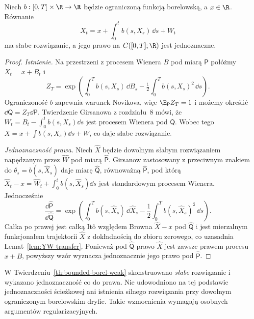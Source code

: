 \begin{twierdzenie}
\label{th:bounded-borel-weak}
Niech $b:[0,T]\times\R\to\R$ będzie ograniczoną funkcją
borelowską, a $x\in\R$. Równanie
\[
 X_t=x+\int_0^t b(s,X_s)\,\dd s+W_t
 \tag{14.2}\label{eq:borel-drift}
\]
ma słabe rozwiązanie, a jego prawo na $C([0,T];\R)$
jest jednoznaczne.
\end{twierdzenie}
\begin{proof}
\emph{Istnienie.} Na przestrzeni z procesem Wienera $B$
pod miarą $\mathsf P$ połóżmy $X_t=x+B_t$ i
\[
 Z_T=\exp\left(\int_0^Tb(s,X_s)\,\dd B_s
 -\tfrac12\int_0^Tb(s,X_s)^2\,\dd s\right).
\]
Ograniczoność $b$ zapewnia warunek Novikova,
więc $\E_{\mathsf P}Z_T=1$ i możemy określić
$\dd\mathsf Q=Z_T\dd\mathsf P$.
Twierdzenie Girsanowa z rozdziału~8 mówi, że
$W_t=B_t-\int_0^tb(s,X_s)\dd s$ jest
procesem Wienera pod $\mathsf Q$.
Wobec tego $X=x+\int b(s,X_s)\dd s+W$,
co daje słabe rozwiązanie.

\emph{Jednoznaczność prawa.} Niech $\widehat X$ będzie
dowolnym słabym rozwiązaniem napędzanym przez
$\widehat W$ pod miarą $\widehat{\mathsf P}$.
Girsanow zastosowany z przeciwnym znakiem do
$\theta_s=b(s,\widehat X_s)$ daje miarę
$\widehat{\mathsf Q}$, równoważną
$\widehat{\mathsf P}$, pod którą
$\widehat X_t-x=\widehat W_t+
\int_0^tb(s,\widehat X_s)\dd s$ jest
standardowym procesem Wienera. Jednocześnie
\[
 \frac{\dd\widehat{\mathsf P}}{\dd\widehat{\mathsf Q}}
 =\exp\left(\int_0^T b(s,\widehat X_s)\,\dd\widehat X_s
 -\frac12\int_0^Tb(s,\widehat X_s)^2\,\dd s\right).
\]
Całka po prawej jest całką Itô względem Browna
$\widehat X-x$ pod $\widehat{\mathsf Q}$ i jest
mierzalnym funkcjonałem trajektorii $\widehat X$
z dokładnością do zbioru zerowego, co uzasadnia
Lemat~\ref{lem:YW-transfer}. Ponieważ pod
$\widehat{\mathsf Q}$ prawo $\widehat X$ jest zawsze
prawem procesu $x+B$, powyższy wzór wyznacza jednoznacznie
jego prawo pod $\widehat{\mathsf P}$.
\end{proof}

\begin{uwaga}
W Twierdzeniu~\ref{th:bounded-borel-weak} skonstruowano
\emph{słabe} rozwiązanie i wykazano jednoznaczność co do
prawa. Nie udowodniono na tej podstawie jednoznaczności
ścieżkowej ani istnienia silnego rozwiązania przy dowolnym
ograniczonym borelowskim dryfie. Takie wzmocnienia wymagają
osobnych argumentów regularizacyjnych.
\end{uwaga}


